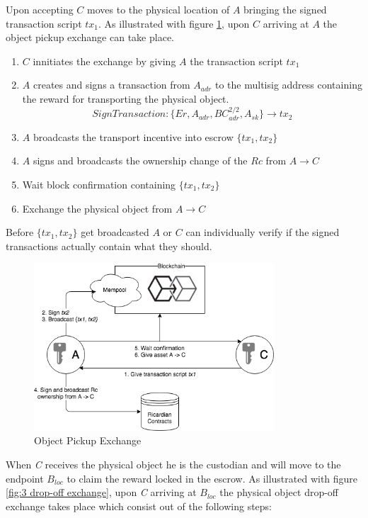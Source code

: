 Upon accepting $C$ moves to the physical location of $A$ bringing the signed transaction script $tx_1$. As illustrated with figure \ref{fig:2 first exchange}, upon $C$ arriving at $A$ the object pickup exchange can take place.

\begin{enumerate}
  \item $C$ innitiates the exchange by giving $A$ the transaction script $tx_1$
  \item $A$ creates and signs a transaction from $A_{adr}$ to the multisig address containing the reward for transporting the physical object.
  \[SignTransaction \colon \{Er, A_{adr}, BC_{adr}^{2/2}, A_{sk}\} \rightarrow tx_2\]
  \item $A$ broadcasts the transport incentive into escrow $\{tx_1, tx_2\}$
  \item $A$ signs and broadcasts the ownership change of the $Rc$ from $A\rightarrow C$
  \item Wait block confirmation containing $\{tx_1, tx_2\}$
  \item Exchange the physical object from $A\rightarrow C$
\end{enumerate}

Before $\{tx_1, tx_2\}$ get broadcasted $A$ or $C$ can individually verify if the signed transactions actually contain what they should.

\begin{figure}[h]
\centering
\includegraphics[width=0.8\textwidth]{images/exchange_01.png}
\caption{Object Pickup Exchange}
\label{fig:2 first exchange}
\end{figure}

 When \textit{C} receives the physical object he is the custodian and will move to the endpoint $B_{loc}$ to claim the reward locked in the escrow. As illustrated with figure \ref{fig:3 drop-off exchange}, upon \textit{C} arriving at $B_{loc}$ the physical object drop-off exchange takes place which consist out of the following steps:

